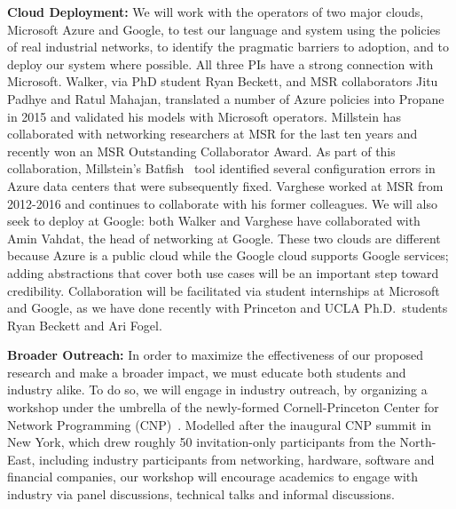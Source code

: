 {\bf Cloud Deployment:}  We will work with the operators of two major clouds, Microsoft Azure and Google, to test our language and system using the policies of real industrial networks, to identify the pragmatic barriers to adoption, and to deploy our system where possible.  All three PIs have a strong connection with Microsoft.  Walker, via PhD student Ryan Beckett, and MSR collaborators Jitu Padhye and Ratul Mahajan, translated a number of Azure policies into Propane in 2015 and validated his models with Microsoft operators. Millstein has collaborated with networking researchers at MSR for the last ten years and recently won an MSR Outstanding Collaborator Award. As part of this collaboration, Millstein's Batfish~\cite{batfish} tool identified several configuration errors in Azure data centers that were subsequently fixed.
Varghese worked at MSR from 2012-2016 and continues to collaborate with his former colleagues.  We will also seek to deploy at Google: both Walker and Varghese have collaborated with Amin Vahdat, the head of networking at Google.  These two clouds are different because Azure is a public cloud while the Google cloud supports Google services; adding abstractions that cover both use cases will be an important step toward credibility.  Collaboration will be facilitated via student internships at Microsoft and Google, as we have done recently with Princeton and UCLA Ph.D.\ students Ryan Beckett and Ari Fogel.

{\bf Broader Outreach:}  
In order to maximize the effectiveness of our proposed research and make a broader
impact, we must educate both students and industry alike.  To do so,
we will engage in industry outreach, by organizing a workshop under
the umbrella of the newly-formed
Cornell-Princeton Center for Network Programming (CNP)~\cite{center-for-network-programming}.
Modelled after the inaugural CNP summit in New York, which drew roughly 50
invitation-only participants from the North-East, including industry participants
from networking, hardware, software and financial companies, our workshop will 
encourage academics to engage with industry via panel
discussions, technical talks and informal discussions.  


